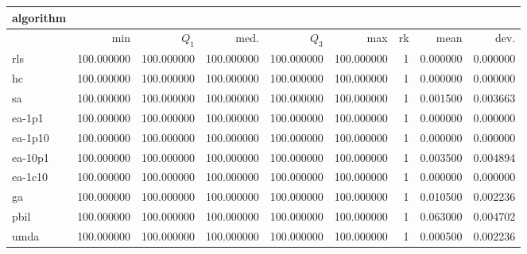 \begin{tabular}{@{}l*{5}{>{{}}N{3}{0}}>{{}}N{2}{0}N{1}{3}N{1}{3}@{}}
\toprule
{algorithm} &  &  \\
\midrule
& {min} & {$Q_1$} & {med.} & {$Q_3$} & {max} & {rk} & {mean} & {dev.} \\
\midrule
rls & {\color{blue}} 100.000000 & {\color{blue}} 100.000000 & {\color{blue}} 100.000000 & {\color{blue}} 100.000000 & {\color{blue}} 100.000000 & 1 & 0.000000 & 0.000000 \\
 hc & {\color{blue}} 100.000000 & {\color{blue}} 100.000000 & {\color{blue}} 100.000000 & {\color{blue}} 100.000000 & {\color{blue}} 100.000000 & 1 & 0.000000 & 0.000000 \\
 sa & {\color{blue}} 100.000000 & {\color{blue}} 100.000000 & {\color{blue}} 100.000000 & {\color{blue}} 100.000000 & {\color{blue}} 100.000000 & 1 & 0.001500 & 0.003663 \\
 ea-1p1 & {\color{blue}} 100.000000 & {\color{blue}} 100.000000 & {\color{blue}} 100.000000 & {\color{blue}} 100.000000 & {\color{blue}} 100.000000 & 1 & 0.000000 & 0.000000 \\
 ea-1p10 & {\color{blue}} 100.000000 & {\color{blue}} 100.000000 & {\color{blue}} 100.000000 & {\color{blue}} 100.000000 & {\color{blue}} 100.000000 & 1 & 0.000000 & 0.000000 \\
 ea-10p1 & {\color{blue}} 100.000000 & {\color{blue}} 100.000000 & {\color{blue}} 100.000000 & {\color{blue}} 100.000000 & {\color{blue}} 100.000000 & 1 & 0.003500 & 0.004894 \\
 ea-1c10 & {\color{blue}} 100.000000 & {\color{blue}} 100.000000 & {\color{blue}} 100.000000 & {\color{blue}} 100.000000 & {\color{blue}} 100.000000 & 1 & 0.000000 & 0.000000 \\
 ga & {\color{blue}} 100.000000 & {\color{blue}} 100.000000 & {\color{blue}} 100.000000 & {\color{blue}} 100.000000 & {\color{blue}} 100.000000 & 1 & 0.010500 & 0.002236 \\
 pbil & {\color{blue}} 100.000000 & {\color{blue}} 100.000000 & {\color{blue}} 100.000000 & {\color{blue}} 100.000000 & {\color{blue}} 100.000000 & 1 & 0.063000 & 0.004702 \\
 umda & {\color{blue}} 100.000000 & {\color{blue}} 100.000000 & {\color{blue}} 100.000000 & {\color{blue}} 100.000000 & {\color{blue}} 100.000000 & 1 & 0.000500 & 0.002236 \\
 \bottomrule
\end{tabular}
